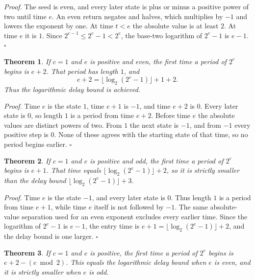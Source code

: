 \documentclass[11pt,letterpaper]{article}
\newtheorem{theorem}{Theorem}
\newenvironment{proof}{\noindent\textit{Proof.}}{\hfill\(\square\)}
\begin{document}
\begin{proof}
The seed is even, and every later state is plus or minus a positive power of two until time \(e\). An even return negates and halves, which multiplies by \(-1\) and lowers the exponent by one. At time \(t<e\) the absolute value is at least \(2\). At time \(e\) it is \(1\). Since \(2^{e-1}\le 2^{e}-1<2^{e}\), the base-two logarithm of \(2^{e}-1\) is \(e-1\).
\end{proof}

\begin{theorem}
\label{thm:negtwodelaysharp}
If \(c=1\) and \(e\) is positive and even, the first time a period of \(2^{e}\) begins is \(e+2\). That period has length \(1\), and
\[
e+2=\lfloor\log_{2}(2^{e}-1)\rfloor+1+2.
\]
Thus the logarithmic delay bound is achieved.
\end{theorem}

\begin{proof}
Time \(e\) is the state \(1\), time \(e+1\) is \(-1\), and time \(e+2\) is \(0\). Every later state is \(0\), so length \(1\) is a period from time \(e+2\). Before time \(e\) the absolute values are distinct powers of two. From \(1\) the next state is \(-1\), and from \(-1\) every positive step is \(0\). None of these agrees with the starting state of that time, so no period begins earlier.
\end{proof}

\begin{theorem}
\label{thm:negtwodelayodd}
If \(c=1\) and \(e\) is positive and odd, the first time a period of \(2^{e}\) begins is \(e+1\). That time equals \(\lfloor\log_{2}(2^{e}-1)\rfloor+2\), so it is strictly smaller than the delay bound \(\lfloor\log_{2}(2^{e}-1)\rfloor+3\).
\end{theorem}

\begin{proof}
Time \(e\) is the state \(-1\), and every later state is \(0\). Thus length \(1\) is a period from time \(e+1\), while time \(e\) itself is not followed by \(-1\). The same absolute-value separation used for an even exponent excludes every earlier time. Since the logarithm of \(2^{e}-1\) is \(e-1\), the entry time is \(e+1=\lfloor\log_{2}(2^{e}-1)\rfloor+2\), and the delay bound is one larger.
\end{proof}

\begin{theorem}
\label{thm:negtwodelayparity}
If \(c=1\) and \(e\) is positive, the first time a period of \(2^{e}\) begins is \(e+2-(e \bmod 2)\). This equals the logarithmic delay bound when \(e\) is even, and it is strictly smaller when \(e\) is odd.
\end{theorem}
\end{document}
